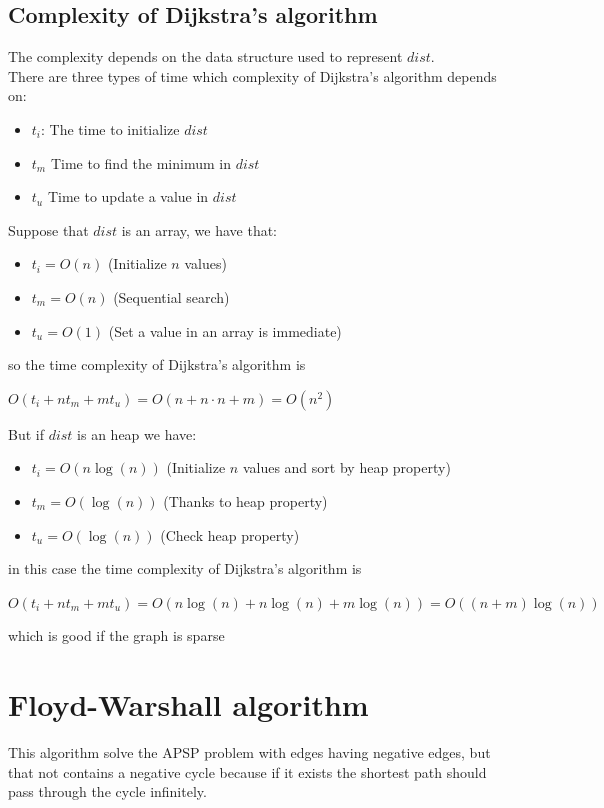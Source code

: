 \documentclass[10pt,a4paper]{book}
\begin{document}
	\section{Complexity of Dijkstra's algorithm}
	The complexity depends on the data structure used to represent $ dist $.\\
	There are three types of time which complexity of Dijkstra's algorithm depends on:
	\begin{itemize}
		\item $ t_i $: The time to initialize $ dist $
		\item $ t_m $ Time to find the minimum in $ dist $
		\item $ t_u $ Time to update a value in $ dist $
	\end{itemize}
	Suppose that $ dist $ is an array, we have that:
	\begin{itemize}
		\item $ t_i = O(n) $ (Initialize $ n $ values) 
		\item $ t_m  = O(n)$ (Sequential search)
		\item $ t_u  = O(1)$ (Set a value in an array is immediate)
	\end{itemize}
		so the time complexity of Dijkstra's algorithm is 
		\begin{center}
			$ O(t_i + n t_m + m t_u)  = O(n + n\cdot n + m) = O(n^2) $ 
		\end{center}
		But if $ dist $ is an heap we have:
		\begin{itemize}
		\item $ t_i = O(n \log(n)) $ (Initialize $ n $ values and sort by heap property) 
		\item $ t_m  = O(\log(n))$ (Thanks to heap property)
		\item $ t_u  = O(\log(n))$ (Check heap property)
		\end{itemize}
		in this case the time complexity of Dijkstra's algorithm is 
		\begin{center}
			$ O(t_i + n t_m + m t_u)  = O(n \log(n)+ n \log(n) + m \log(n)) = O((n+m) \log(n)) $ 
		\end{center}
		which is good if the graph is sparse
		\chapter{Floyd-Warshall algorithm}
		This algorithm solve the APSP problem with  edges having negative edges, but that not contains a negative cycle because if it exists the shortest path should pass through the cycle infinitely.
\end{document}
